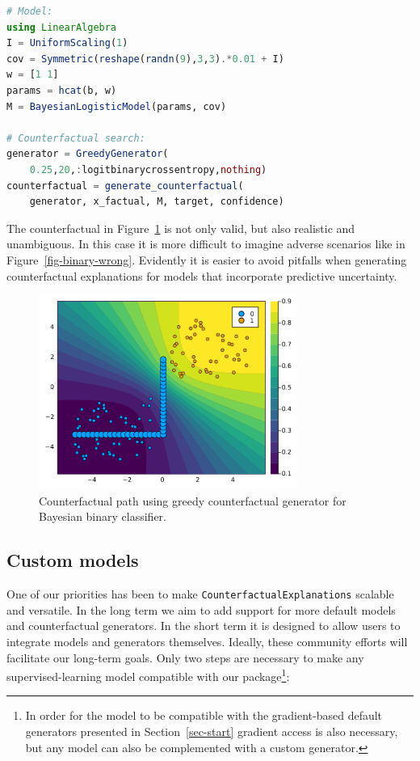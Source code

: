 \documentclass{juliacon}
\begin{document}
\begin{lstlisting}[language = Julia]
# Model:
using LinearAlgebra
I = UniformScaling(1)
cov = Symmetric(reshape(randn(9),3,3).*0.01 + I) 
w = [1 1]
params = hcat(b, w)
M = BayesianLogisticModel(params, cov)

# Counterfactual search:
generator = GreedyGenerator(
    0.25,20,:logitbinarycrossentropy,nothing)
counterfactual = generate_counterfactual(
    generator, x_factual, M, target, confidence)
\end{lstlisting}

The counterfactual in Figure~\ref{fig-binary-laplace} is not only valid,
but also realistic and unambiguous. In this case it is more difficult to
imagine adverse scenarios like in Figure~\ref{fig-binary-wrong}.
Evidently it is easier to avoid pitfalls when generating counterfactual
explanations for models that incorporate predictive uncertainty.

\begin{figure}

{\centering \includegraphics[width=3.33333in,height=2.5in]{www/ce_binary_laplace.png}

}

\caption{\label{fig-binary-laplace}Counterfactual path using greedy
counterfactual generator for Bayesian binary classifier.}

\end{figure}

\hypertarget{custom-models}{%
\subsection{Custom models}\label{custom-models}}

One of our priorities has been to make
\texttt{CounterfactualExplanations} scalable and versatile. In the long
term we aim to add support for more default models and counterfactual
generators. In the short term it is designed to allow users to integrate
models and generators themselves. Ideally, these community efforts will
facilitate our long-term goals. Only two steps are necessary to make any
supervised-learning model compatible with our package\footnote{In order
  for the model to be compatible with the gradient-based default
  generators presented in Section~\ref{sec-start} gradient access is
  also necessary, but any model can also be complemented with a custom
  generator.}:
\end{document}
